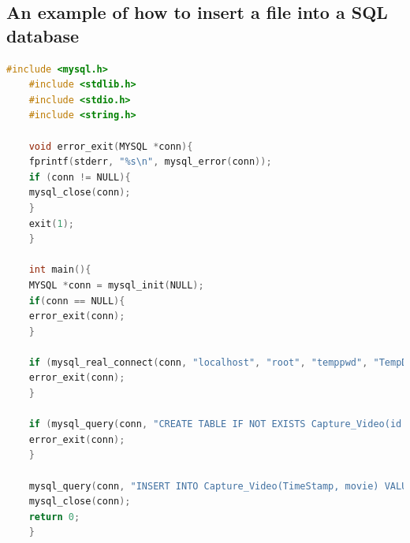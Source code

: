 \documentclass[12pt,journal,draftclsnofoot,onecolumn]{IEEEtran}
\begin{document}
	\subsection{An example of how to insert a file into a SQL database}\label{AppendixSQL}	
	\begin{lstlisting}[language={c}]
	#include <mysql.h>
	#include <stdlib.h>
	#include <stdio.h>
	#include <string.h>
	
	void error_exit(MYSQL *conn){
	fprintf(stderr, "%s\n", mysql_error(conn));
	if (conn != NULL){
	mysql_close(conn);
	}
	exit(1);
	}
	
	int main(){
	MYSQL *conn = mysql_init(NULL);
	if(conn == NULL){
	error_exit(conn);
	}
	
	if (mysql_real_connect(conn, "localhost", "root", "temppwd", "TempDB", 0, NULL, 0) == NULL)	{
	error_exit(conn);
	}
	
	if (mysql_query(conn, "CREATE TABLE IF NOT EXISTS Capture_Video(id INT PRIMARY KEY AUTO_INCREMENT, TimeStamp DATETIME, movie LONGBLOB)")){
	error_exit(conn);
	}
	
	mysql_query(conn, "INSERT INTO Capture_Video(TimeStamp, movie) VALUES(NOW(), LOAD_FILE('/var/www/WebCam/output.mp4'))");
	mysql_close(conn);
	return 0;
	}
	\end{lstlisting}
\end{document}
